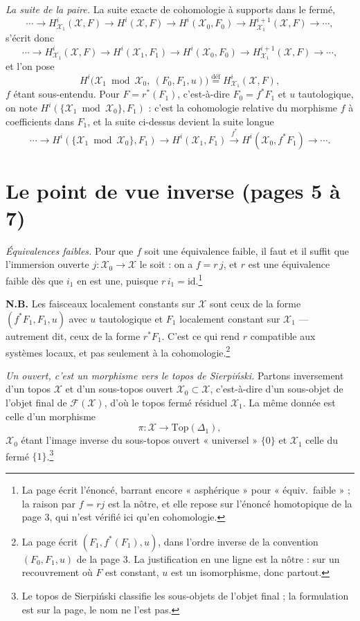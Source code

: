 \documentclass[11pt,a4paper]{article}
\begin{document}
\emph{La suite de la paire.} La suite exacte de cohomologie à supports dans le
fermé,
\[
\cdots \to H^{i}_{\mathcal{X}_{1}}(\mathcal{X}, F) \to H^{i}(\mathcal{X}, F)
\to H^{i}(\mathcal{X}_{0}, F_{0}) \to H^{i+1}_{\mathcal{X}_{1}}(\mathcal{X}, F)
\to \cdots,
\]
s'écrit donc
\[
\cdots \to H^{i}_{\mathcal{X}_{1}}(\mathcal{X}, F) \to H^{i}(\mathcal{X}_{1},
F_{1}) \to H^{i}(\mathcal{X}_{0}, F_{0}) \to H^{i+1}_{\mathcal{X}_{1}}(\mathcal{X},
F) \to \cdots,
\]
et l'on pose
\[
H^{i}\bigl(\mathcal{X}_{1} \bmod \mathcal{X}_{0},\ (F_{0}, F_{1}, u)\bigr)
\overset{\text{déf}}{=} H^{i}_{\mathcal{X}_{1}}(\mathcal{X}, F),
\]
$f$ étant sous-entendu. Pour $F = r^{*}(F_{1})$, c'est-à-dire $F_{0} =
f^{*}F_{1}$ et $u$ tautologique, on note
$H^{i}(\{\mathcal{X}_{1} \bmod \mathcal{X}_{0}\}, F_{1})$ : c'est la cohomologie
relative du morphisme $f$ à coefficients dans $F_{1}$, et la suite ci-dessus
devient la suite longue
\[
\cdots \to H^{i}(\{\mathcal{X}_{1} \bmod \mathcal{X}_{0}\}, F_{1}) \to
H^{i}(\mathcal{X}_{1}, F_{1}) \xrightarrow{f^{*}} H^{i}(\mathcal{X}_{0},
f^{*}F_{1}) \to \cdots.
\]

\section*{Le point de vue inverse (pages 5 à 7)}

\emph{Équivalences faibles.} Pour que $f$ soit une équivalence faible, il faut
et il suffit que l'immersion ouverte $j : \mathcal{X}_{0} \to \mathcal{X}$ le
soit : on a $f = r\, j$, et $r$ est une équivalence faible dès que $i_{1}$ en
est une, puisque $r\, i_{1} = \mathrm{id}$.\footnote{La page écrit l'énoncé,
barrant encore « asphérique » pour « équiv.\ faible » ; la raison par
$f = rj$ est la nôtre, et elle repose sur l'énoncé homotopique de la page 3,
qui n'est vérifié ici qu'en cohomologie.}

\textbf{N.B.} Les faisceaux localement constants sur $\mathcal{X}$ sont ceux de
la forme $(f^{*}F_{1}, F_{1}, u)$ avec $u$ tautologique et $F_{1}$ localement
constant sur $\mathcal{X}_{1}$ --- autrement dit, ceux de la forme $r^{*}F_{1}$.
C'est ce qui rend $r$ compatible aux systèmes locaux, et pas seulement à la
cohomologie.\footnote{La page écrit $(F_{1}, f^{*}(F_{1}), u)$, dans l'ordre
inverse de la convention $(F_{0}, F_{1}, u)$ de la page 3. La justification
en une ligne est la nôtre : sur un recouvrement où $F$ est constant, $u$ est un
isomorphisme, donc partout.}

\emph{Un ouvert, c'est un morphisme vers le topos de Sierpiński.} Partons
inversement d'un topos $\mathcal{X}$ et d'un sous-topos ouvert
$\mathcal{X}_{0} \subset \mathcal{X}$, c'est-à-dire d'un sous-objet de l'objet
final de $\mathcal{F}(\mathcal{X})$, d'où le topos fermé résiduel
$\mathcal{X}_{1}$. La même donnée est celle d'un morphisme
\[
\pi : \mathcal{X} \longrightarrow \mathrm{Top}(\Delta_{1}),
\]
$\mathcal{X}_{0}$ étant l'image inverse du sous-topos ouvert « universel »
$\{0\}$ et $\mathcal{X}_{1}$ celle du fermé $\{1\}$.\footnote{Le topos de
Sierpiński classifie les sous-objets de l'objet final ; la formulation est sur
la page, le nom ne l'est pas.}
\end{document}
